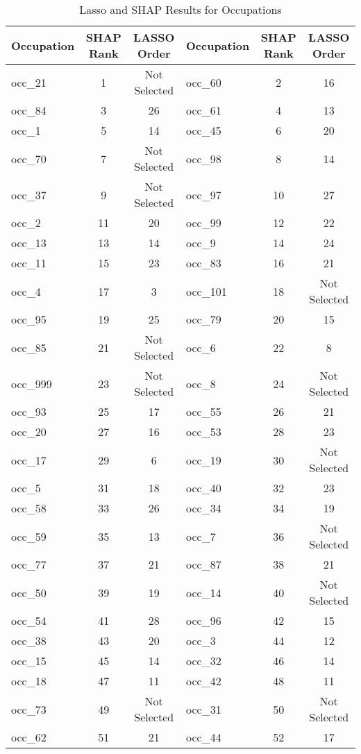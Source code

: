 \documentclass[12pt]{article}
\begin{document}
\begin{table}[H]
\centering
\caption{Lasso and SHAP Results for Occupations}

\scriptsize  %

\begin{tabular}{lcc|lcc}
\toprule
Occupation & SHAP Rank & LASSO Order & Occupation & SHAP Rank & LASSO Order \\
\midrule
occ\_21 & 1 & Not Selected & occ\_60 & 2 & 16 \\
occ\_84 & 3 & 26 & occ\_61 & 4 & 13 \\
occ\_1 & 5 & 14 & occ\_45 & 6 & 20 \\
occ\_70 & 7 & Not Selected & occ\_98 & 8 & 14 \\
occ\_37 & 9 & Not Selected & occ\_97 & 10 & 27 \\
occ\_2 & 11 & 20 & occ\_99 & 12 & 22 \\
occ\_13 & 13 & 14 & occ\_9 & 14 & 24 \\
occ\_11 & 15 & 23 & occ\_83 & 16 & 21 \\
occ\_4 & 17 & 3 & occ\_101 & 18 & Not Selected \\
occ\_95 & 19 & 25 & occ\_79 & 20 & 15 \\
occ\_85 & 21 & Not Selected & occ\_6 & 22 & 8 \\
occ\_999 & 23 & Not Selected & occ\_8 & 24 & Not Selected \\
occ\_93 & 25 & 17 & occ\_55 & 26 & 21 \\
occ\_20 & 27 & 16 & occ\_53 & 28 & 23 \\
occ\_17 & 29 & 6 & occ\_19 & 30 & Not Selected \\
occ\_5 & 31 & 18 & occ\_40 & 32 & 23 \\
occ\_58 & 33 & 26 & occ\_34 & 34 & 19 \\
occ\_59 & 35 & 13 & occ\_7 & 36 & Not Selected \\
occ\_77 & 37 & 21 & occ\_87 & 38 & 21 \\
occ\_50 & 39 & 19 & occ\_14 & 40 & Not Selected \\
occ\_54 & 41 & 28 & occ\_96 & 42 & 15 \\
occ\_38 & 43 & 20 & occ\_3 & 44 & 12 \\
occ\_15 & 45 & 14 & occ\_32 & 46 & 14 \\
occ\_18 & 47 & 11 & occ\_42 & 48 & 11 \\
occ\_73 & 49 & Not Selected & occ\_31 & 50 & Not Selected \\
occ\_62 & 51 & 21 & occ\_44 & 52 & 17 \\

\end{tabular}
\end{table}
\end{document}
